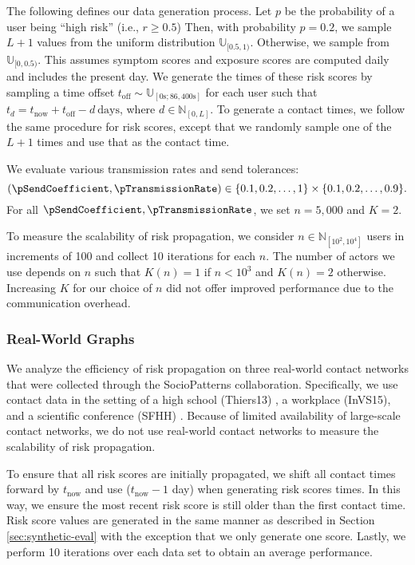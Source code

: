 The following defines our data generation process. Let $p$ be the probability of a user being ``high risk'' (i.e., $r \geq 0.5$) Then, with probability $p = 0.2$, we sample $L + 1$ values from the uniform distribution $\mathbb{U}_{[0.5, 1)}$. Otherwise, we sample from $\mathbb{U}_{[0, 0.5)}$. This assumes symptom scores and exposure scores are computed daily and includes the present day. We generate the times of these risk scores by sampling a time offset $t_{\text{off}} \sim \mathbb{U}_{[0\text{s}; 86,400\text{s}]}$ for each user such that $t_d = t_{\text{now}} + t_{\text{off}} - d~\text{days}$, where $d \in \mathbb{N}_{[0, L]}$. To generate a contact times, we follow the same procedure for risk scores, except that we randomly sample one of the $L + 1$ times and use that as the contact time.

We evaluate various transmission rates and send tolerances:
\begin{displaymath}
	(\pSendCoefficient, \pTransmissionRate) \in \{0.1, 0.2, \ldots, 1\} \times \{0.1, 0.2, \ldots, 0.9\}.
\end{displaymath}
For all $\pSendCoefficient, \pTransmissionRate$, we set $n = 5,000$ and $K = 2$.

To measure the scalability of risk propagation, we consider $n \in \mathbb{N}_{[10^2, 10^4]}$ users in increments of 100 and collect 10 iterations for each $n$. The number of actors we use depends on $n$ such that $K(n) = 1$ if $n < 10^3$ and $K(n) = 2$ otherwise. Increasing $K$ for our choice of $n$ did not offer improved performance due to the communication overhead.

\subsubsection{Real-World Graphs}

We analyze the efficiency of risk propagation on three real-world contact networks that were collected through the SocioPatterns collaboration. Specifically, we use contact data in the setting of a high school (Thiers13) \cite{Fournet2014}, a workplace (InVS15), and a scientific conference (SFHH) \cite{Genois2018}. Because of limited availability of large-scale contact networks, we do not use real-world contact networks to measure the scalability of risk propagation.

To ensure that all risk scores are initially propagated, we shift all contact times forward by $t_{\text{now}}$ and use ($t_{\text{now}} - 1$ day) when generating risk scores times. In this way, we ensure the most recent risk score is still older than the first contact time. Risk score values are generated in the same manner as described in Section \ref{sec:synthetic-eval} with the exception that we only generate one score. Lastly, we perform 10 iterations over each data set to obtain an average performance.

